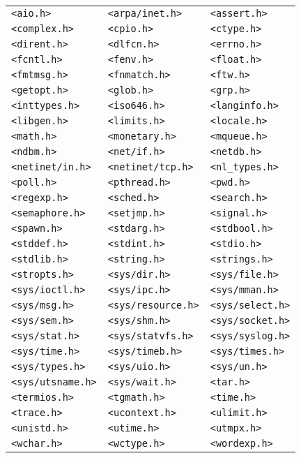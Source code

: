 \begin{tabular}{lll}\ttfamily
\texttt{<aio.h>} &
\texttt{<arpa/inet.h>} &
\texttt{<assert.h>} \\
\texttt{<complex.h>} &
\texttt{<cpio.h>} &
\texttt{<ctype.h>} \\
\texttt{<dirent.h>} &
\texttt{<dlfcn.h>} &
\texttt{<errno.h>} \\
\texttt{<fcntl.h>} &
\texttt{<fenv.h>} &
\texttt{<float.h>} \\
\texttt{<fmtmsg.h>} &
\texttt{<fnmatch.h>} &
\texttt{<ftw.h>} \\
\texttt{<getopt.h>} &
\texttt{<glob.h>} &
\texttt{<grp.h>} \\
\texttt{<inttypes.h>} &
\texttt{<iso646.h>} &
\texttt{<langinfo.h>} \\
\texttt{<libgen.h>} &
\texttt{<limits.h>} &
\texttt{<locale.h>} \\
\texttt{<math.h>} &
\texttt{<monetary.h>} &
\texttt{<mqueue.h>} \\
\texttt{<ndbm.h>} &
\texttt{<net/if.h>} &
\texttt{<netdb.h>} \\
\texttt{<netinet/in.h>} &
\texttt{<netinet/tcp.h>} &
\texttt{<nl_types.h>} \\
\texttt{<poll.h>} &
\texttt{<pthread.h>} &
\texttt{<pwd.h>} \\
\texttt{<regexp.h>} &
\texttt{<sched.h>} &
\texttt{<search.h>} \\
\texttt{<semaphore.h>} &
\texttt{<setjmp.h>} &
\texttt{<signal.h>} \\
\texttt{<spawn.h>} &
\texttt{<stdarg.h>} &
\texttt{<stdbool.h>} \\
\texttt{<stddef.h>} &
\texttt{<stdint.h>} &
\texttt{<stdio.h>} \\
\texttt{<stdlib.h>} &
\texttt{<string.h>} &
\texttt{<strings.h>} \\
\texttt{<stropts.h>} &
\texttt{<sys/dir.h>} &
\texttt{<sys/file.h>} \\
\texttt{<sys/ioctl.h>} &
\texttt{<sys/ipc.h>} &
\texttt{<sys/mman.h>} \\
\texttt{<sys/msg.h>} &
\texttt{<sys/resource.h>} &
\texttt{<sys/select.h>} \\
\texttt{<sys/sem.h>} &
\texttt{<sys/shm.h>} &
\texttt{<sys/socket.h>} \\
\texttt{<sys/stat.h>} &
\texttt{<sys/statvfs.h>} &
\texttt{<sys/syslog.h>} \\
\texttt{<sys/time.h>} &
\texttt{<sys/timeb.h>} &
\texttt{<sys/times.h>} \\
\texttt{<sys/types.h>} &
\texttt{<sys/uio.h>} &
\texttt{<sys/un.h>} \\
\texttt{<sys/utsname.h>} &
\texttt{<sys/wait.h>} &
\texttt{<tar.h>} \\
\texttt{<termios.h>} &
\texttt{<tgmath.h>} &
\texttt{<time.h>} \\
\texttt{<trace.h>} &
\texttt{<ucontext.h>} &
\texttt{<ulimit.h>} \\
\texttt{<unistd.h>} &
\texttt{<utime.h>} &
\texttt{<utmpx.h>} \\
\texttt{<wchar.h>} &
\texttt{<wctype.h>} &
\texttt{<wordexp.h>}
\end{tabular}




